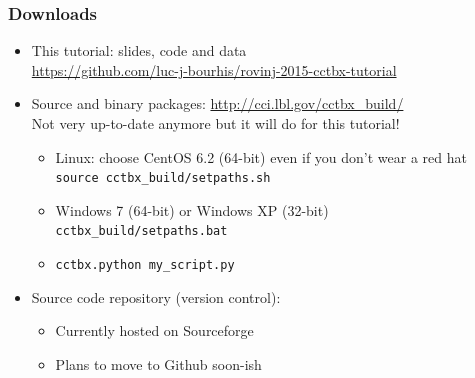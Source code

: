 \documentclass[10pt]{beamer}
\begin{document}
\begin{frame}[fragile]
\frametitle{Downloads}
\begin{itemize}
\item This tutorial: slides, code and data\\\url{https://github.com/luc-j-bourhis/rovinj-2015-cctbx-tutorial}\item Source and binary packages: \url{http://cci.lbl.gov/cctbx_build/} \\
      Not very up-to-date anymore but it will do for this tutorial!
      \begin{itemize}
      \item Linux: choose CentOS 6.2 (64-bit) even if you don't wear a red hat\\
            \verb!source cctbx_build/setpaths.sh!
      \item Windows 7 (64-bit) or Windows XP (32-bit)\\
            \verb!cctbx_build/setpaths.bat!
      \item \verb!cctbx.python my_script.py!
      \end{itemize}
\item Source code repository (version control): 
\begin{itemize} 
\item Currently hosted on Sourceforge
\item Plans to move to Github soon-ish
\end{itemize}
\end{itemize}
\end{frame}
\end{document}
